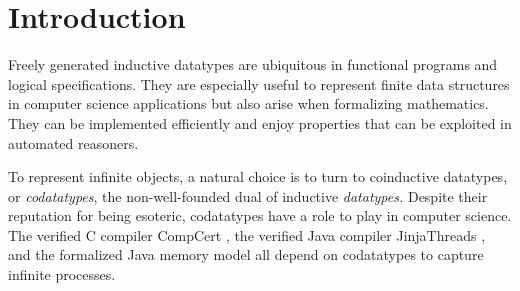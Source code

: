 \begin{nomemoriam}
\smallskipamount
\end{nomemoriam}

\setcounter{footnote}{0}

\section{Introduction}
\label{sec:introduction}

Freely generated inductive datatypes are ubiquitous in functional programs and
logical specifications. They are especially
useful to represent finite data structures in computer science applications but
also arise when formalizing mathematics.
They can be implemented efficiently and enjoy
properties that can be exploited in automated reasoners.
%

To represent infinite objects, %
a natural choice is to turn to coinductive datatypes, or \emph{codatatypes},
the non-well-founded dual of inductive \emph{datatypes.}
%
Despite their reputation for being esoteric, codatatypes have a
role to play in computer science. The verified C compiler CompCert
\cite{leroy-2009}, the verified Java compiler Jinja\-Threads
\cite{lochbihler-2010-jinja}, and the formalized Java memory model
\cite{lochbihler-2014-jmm} all depend on codatatypes to capture infinite
processes.


